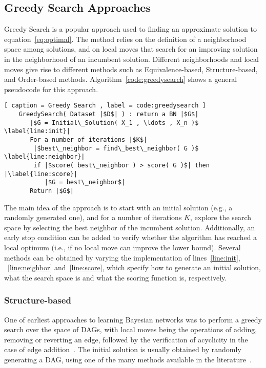 \subsection{Greedy Search Approaches}
\label{subsec:greedysearch}

Greedy Search is a popular approach used to finding an approximate solution to equation~\eqref{eq:optimal}. The method relies on the definition of a neighborhood space among solutions, and on local moves that search for an improving solution in the neighborhood of an incumbent solution. Different neighborhoods and local moves give rise to different methods such as Equivalence-based, Structure-based,  and Order-based methods. Algorithm~\ref{code:greedysearch} shows a general pseudocode for this approach.

\begin{lstlisting}[ caption = Greedy Search , label = code:greedysearch ]
	GreedySearch( Dataset |$D$| ) : return a BN |$G$|
	   |$G = Initial\_Solution( X_1 , \ldots , X_n )$ \label{line:init}|
	   For a number of iterations |$K$|
		|$best\_neighbor = find\_best\_neighbor( G )$ \label{line:neighbor}|
		if |$score( best\_neighbor ) > score( G )$| then |\label{line:score}|
		   |$G = best\_neighbor$|
	   Return |$G$|
\end{lstlisting}
The main idea of the approach is to start with an initial solution (e.g., a randomly generated one), and for a number of iterations $K$, explore the search space by selecting the best neighbor of the incumbent solution. Additionally, an early stop condition can be added to verify whether the algorithm has reached a local optimum (i.e., if no local move can improve the lower bound).
Several methods can be obtained by varying the implementation of lines~\ref{line:init}, ~\ref{line:neighbor} and~\ref{line:score}, which specify how to generate an initial solution, what the search space is and what the scoring function is, respectively.

\subsubsection{Structure-based}
\label{subsub:structurebased}
One of earliest approaches to learning Bayesian networks was to perform a greedy search over the space of DAGs, with local moves being the operations of adding, removing or reverting an edge, followed by the verification of acyclicity in the case of edge addition~\cite{Cooper92,GH08}. The initial solution is usually obtained by randomly generating a DAG, using one of the many methods available in the literature~\cite{Cozman02,Melancon04}.

